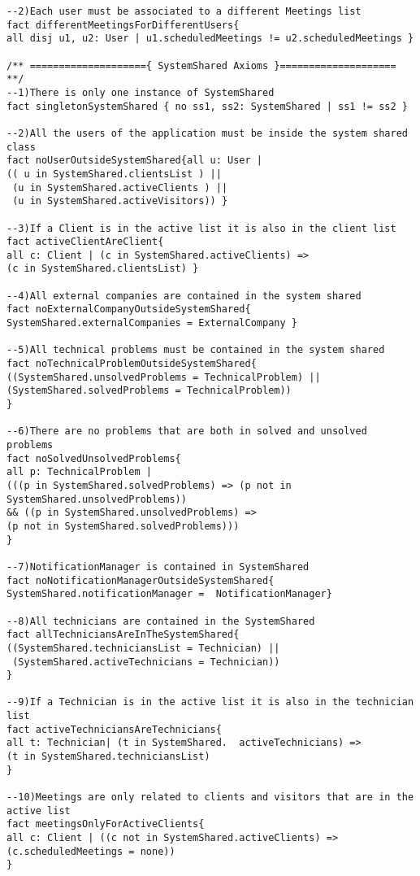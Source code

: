 \documentclass[a4paper,leqno]{book}
\begin{document}
\begin{lstlisting}
--2)Each user must be associated to a different Meetings list
fact differentMeetingsForDifferentUsers{ 
all disj u1, u2: User | u1.scheduledMeetings != u2.scheduledMeetings }

/** ===================={ SystemShared Axioms }==================== **/
--1)There is only one instance of SystemShared
fact singletonSystemShared { no ss1, ss2: SystemShared | ss1 != ss2 }

--2)All the users of the application must be inside the system shared 
class
fact noUserOutsideSystemShared{all u: User |
(( u in SystemShared.clientsList ) ||
 (u in SystemShared.activeClients ) || 
 (u in SystemShared.activeVisitors)) }

--3)If a Client is in the active list it is also in the client list
fact activeClientAreClient{ 
all c: Client | (c in SystemShared.activeClients) => 
(c in SystemShared.clientsList) }

--4)All external companies are contained in the system shared
fact noExternalCompanyOutsideSystemShared{ 
SystemShared.externalCompanies = ExternalCompany }

--5)All technical problems must be contained in the system shared
fact noTechnicalProblemOutsideSystemShared{
((SystemShared.unsolvedProblems = TechnicalProblem) || 
(SystemShared.solvedProblems = TechnicalProblem))
}

--6)There are no problems that are both in solved and unsolved problems
fact noSolvedUnsolvedProblems{
all p: TechnicalProblem |
(((p in SystemShared.solvedProblems) => (p not in SystemShared.unsolvedProblems)) 
&& ((p in SystemShared.unsolvedProblems) => 
(p not in SystemShared.solvedProblems)))
}

--7)NotificationManager is contained in SystemShared
fact noNotificationManagerOutsideSystemShared{
SystemShared.notificationManager =  NotificationManager}

--8)All technicians are contained in the SystemShared
fact allTechniciansAreInTheSystemShared{
((SystemShared.techniciansList = Technician) ||
 (SystemShared.activeTechnicians = Technician))
}

--9)If a Technician is in the active list it is also in the technician list
fact activeTechniciansAreTechnicians{
all t: Technician| (t in SystemShared.	activeTechnicians) => 
(t in SystemShared.techniciansList)
}

--10)Meetings are only related to clients and visitors that are in the active list
fact meetingsOnlyForActiveClients{
all c: Client | ((c not in SystemShared.activeClients) => 
(c.scheduledMeetings = none))
}


\end{lstlisting}
\end{document}
